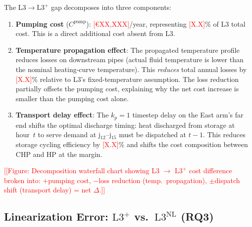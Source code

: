 \documentclass[review,3p]{elsarticle}
\newcommand{\placeholder}[1]{\textcolor{red}{[#1]}}
\newcommand{\Lplus}{\mathrm{L3}^{+}}
\newcommand{\Lnl}{\mathrm{L3}^{\mathrm{NL}}}
\begin{document}
The L3$\to\Lplus$ gap decomposes into three components:

\begin{enumerate}[nosep]
    \item \textbf{Pumping cost} ($C^{\mathrm{pump}}$):
    \placeholder{€XX,XXX}/year, representing
    \placeholder{X.X}\% of L3 total cost. This is a direct
    additional cost absent from L3.

    \item \textbf{Temperature propagation effect}: The propagated
    temperature profile reduces losses on downstream pipes (actual
    fluid temperature is lower than the nominal heating-curve
    temperature). This \emph{reduces} total annual losses by
    \placeholder{X.X}\% relative to L3's fixed-temperature
    assumption. The loss reduction partially offsets the pumping
    cost, explaining why the net cost increase is smaller than the
    pumping cost alone.

    \item \textbf{Transport delay effect}: The $k_p = 1$ timestep
    delay on the East arm's far end shifts the optimal discharge
    timing: heat discharged from storage at hour~$t$ to serve
    demand at j$_{12}$--j$_{15}$ must be dispatched at
    $t - 1$. This reduces storage cycling efficiency by
    \placeholder{X.X}\% and shifts the cost composition between
    CHP and HP at the margin.
\end{enumerate}

\placeholder{[Figure: Decomposition waterfall chart showing L3
$\to$ $\Lplus$ cost difference broken into: $+$pumping cost,
$-$loss reduction (temp.\ propagation), $\pm$dispatch shift
(transport delay) = net $\Delta$.]}

\subsection{Linearization Error: $\Lplus$ vs.\ $\Lnl$ (RQ3)}
\label{sec:results_linearization}
\end{document}
